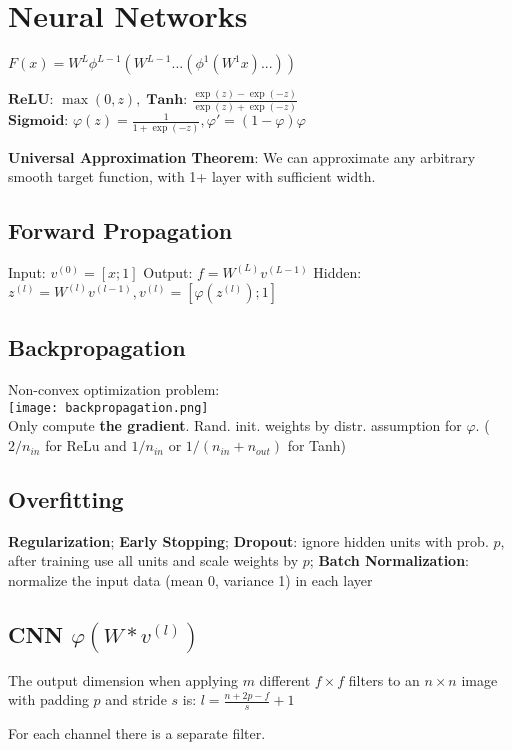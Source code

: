 \section*{Neural Networks}

$F(x)=W^{L}\phi^{L-1}(W^{L-1}...(\phi^{1}(W^{1}x)...))$

$\textbf{ReLU: } \max (0,z), \; \textbf{Tanh: } \frac{\exp(z) - \exp(-z)}{\exp(z) + \exp(-z)}$ \\[-3pt]
$\textbf{Sigmoid: } \varphi(z) = \frac{1}{1 + \exp(-z)}, \varphi' = (1 - \varphi) \varphi$


\textbf{Universal Approximation Theorem}: We can approximate any arbitrary smooth target function, with 1+ layer with sufficient width.

\subsection*{Forward Propagation}

Input: $v^{(0)} = [x; 1]$ \quad Output: $f = W^{(L)} v^{(L-1)}$
Hidden: $z^{(l)} = W^{(l)} v^{(l-1)}, v^{(l)} = [\varphi(z^{(l)}); 1]$


\subsection*{Backpropagation}

Non-convex optimization problem: \\[-10pt]

\texttt{[image: backpropagation.png]} \\[-15pt]

Only compute \color{Red} \textbf{the gradient}\color{Black}. Rand. init. weights by distr. assumption for $\varphi$. ( $2 / n_{in}$ for ReLu and $1/n_{in}$ or $ 1/ (n_{in} + n_{out})$ for Tanh)

\subsection*{Overfitting}
\textbf{Regularization}; \textbf{Early Stopping}; \textbf{Dropout}: ignore hidden units with prob. $p$, after training use all units and scale weights by $p$; \textbf{Batch Normalization}: normalize the input data (mean 0, variance 1) in each layer

\subsection*{CNN \quad \color{Black}$\varphi(W * v^{(l)})$}

The output dimension when applying $m$ different $f \times f$ filters to an $n \times n$ image with padding $p$ and stride $s$ is: $l = \frac{n + 2p - f}{s} + 1$

For each channel there is a separate filter.
